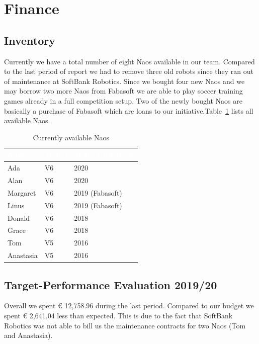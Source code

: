\documentclass[11pt]{article}
\begin{document}
\section{Finance}
\subsection{Inventory}
Currently we have a total number of eight Naos available in our team. Compared to the last period of report we had to remove three old robots since they ran out of maintenance at SoftBank Robotics. Since we bought four new Naos and we may borrow two more Naos from Fabasoft we are able to play soccer training games already in a full competition setup. Two of the newly bought Naos are basically a purchase of Fabasoft which are loans to our initiative.Table~\ref{tab:naos} lists all available Naos.

\begin{table}[b]
\begin{center}
\begin{tabular}{|p{.3\linewidth}|p{.1\linewidth}|p{.2\linewidth}|}
\hline
\cellcolor{gray!100}\textcolor{white}{Name} & \cellcolor{gray!100}\textcolor{white}{Model} & \cellcolor{gray!100}\textcolor{white}{Year of Purchase} \\ \hline
Ada & V6 & 2020 \\ \hline
Alan & V6 & 2020 \\ \hline
Margaret & V6 & 2019 (Fabasoft) \\ \hline
Linus & V6 & 2019 (Fabasoft) \\ \hline
Donald & V6 & 2018 \\ \hline
Grace & V6 & 2018 \\ \hline
Tom & V5 & 2016 \\ \hline
Anastasia & V5 & 2016 \\ \hline
\end{tabular}
\end{center}
\caption{Currently available Naos}
\label{tab:naos}
\end{table}

\subsection{Target-Performance Evaluation 2019/20}\label{sec:tpe}
Overall we spent € 12,758.96 during the last period. Compared to our budget we spent € 2,641.04 less than expected. This is due to the fact that SoftBank Robotics was not able to bill us the maintenance contracts for two Naos (Tom and Anastasia).
\end{document}
